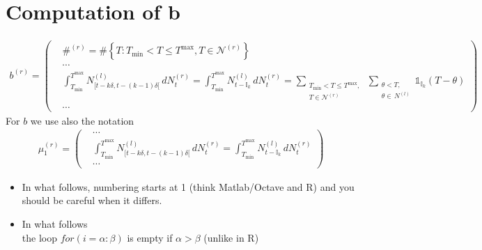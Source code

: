 \documentclass{article}
\newcommand{\be}{\begin{eqnarray*}}
\newcommand{\ee}{\end{eqnarray*}}
\newcommand{\dsp}{\displaystyle}
\def\Ik{\mathbb{I}_k}
\def\Tmin{T_{\min}}
\def\Tmax{T^{\max}}
\begin{document}
\section{Computation of b}
\be
b^{(r)} = \left(
\begin{array}{ll}
  &\#^{(r)} = \# \left\{T: \Tmin<T\leq\Tmax,T\in \mathcal{N}^{(r)}\right\}\\
  &\cdots\\
&\dsp\int_{\Tmin}^{\Tmax}N^{(l)}_{[t-k\delta,t-(k-1)\delta[}\,dN^{(r)}_t = \dsp\int_{\Tmin}^{\Tmax}N^{(l)}_{t-\Ik}\,dN^{(r)}_t =\dsp\sum_{\substack{\Tmin<T\leq\Tmax,\\T\in \mathcal{N}^{(r)}}}\,\sum_{\substack{\theta<T,\\ \theta\in\,N^{(l)}}}\mathds{1}_{\Ik}(T-\theta) \\
  &\cdots
\end{array}
\right)
\ee
For $b$ we use also the notation
\be
\mu_1^{(r)} = \left(
\begin{array}{ll}
  &\cdots\\
&\dsp\int_{\Tmin}^{\Tmax}N^{(l)}_{[t-k\delta,t-(k-1)\delta[}\,dN^{(r)}_t = \dsp\int_{\Tmin}^{\Tmax}N^{(l)}_{t-\Ik}\,dN^{(r)}_t \\
  &\cdots
\end{array}
\right)
\ee
{}
\begin{itemize}
\item In what follows, numbering starts at 1 (think Matlab/Octave and R) and you should be careful when it differs.
\item In what follows\\ the loop $for(i= \alpha:\beta)$ is empty if $\alpha> \beta$ (unlike in R)
\end{itemize}
\end{document}
